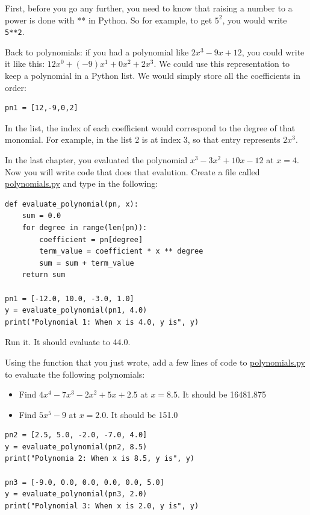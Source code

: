 First, before you go any further, you need to know that raising a
number to a power is done with ** in Python.  So for example, to get
$5^2$, you would write \texttt{5**2}.

Back to polynomials: if you had a polynomial like $2x^3 -9x + 12$, you
could write it like this: $12x^0 + (-9)x^1 + 0x^2 + 2x^3$.  We could
use this representation to keep a polynomial in a Python list. We
would simply store all the coefficients in order:
\begin{Verbatim}
pn1 = [12,-9,0,2]
\end{Verbatim}

In the list, the index of each coefficient would correspond to the
degree of that monomial. For example, in the list 2 is at index 3, so
that entry represents $2x^3$.

In the last chapter, you evaluated the polynomial $x^3 - 3x^2 + 10x -
12$ at $x=4$. Now you will write code that does that evalution.
Create a file called \url{polynomials.py} and type in the following:

\begin{Verbatim}
def evaluate_polynomial(pn, x):
    sum = 0.0  
    for degree in range(len(pn)):
        coefficient = pn[degree]
        term_value = coefficient * x ** degree
        sum = sum + term_value
    return sum
   
pn1 = [-12.0, 10.0, -3.0, 1.0]
y = evaluate_polynomial(pn1, 4.0)
print("Polynomial 1: When x is 4.0, y is", y)
\end{Verbatim}

Run it. It should evaluate to 44.0.

\begin{Exercise}[title={Evaluate Polynomials}, label=pyevalpolynomials]
Using the function that you just wrote, add a few lines of code to \url{polynomials.py} to evaluate the following polynomials:
\begin{itemize}
\item Find $4x^4 - 7x^3 - 2x^2 + 5x + 2.5$ at $x = 8.5$.  It should be 16481.875
\item Find $5x^5 - 9$ at $x = 2.0$.  It should be 151.0
\end{itemize}
\end{Exercise}
\begin{Answer}[ref=pyevalpolynomials]
\begin{Verbatim}
pn2 = [2.5, 5.0, -2.0, -7.0, 4.0]
y = evaluate_polynomial(pn2, 8.5)
print("Polynomia 2: When x is 8.5, y is", y)

pn3 = [-9.0, 0.0, 0.0, 0.0, 0.0, 5.0]
y = evaluate_polynomial(pn3, 2.0)
print("Polynomial 3: When x is 2.0, y is", y)    
\end{Verbatim} 
\end{Answer}

